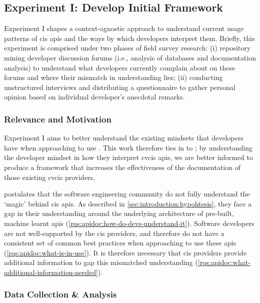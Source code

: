 \subsection{Experiment I: Develop Initial Framework}
\label{ssec:research-methodology:experiments:1}

Experiment I shapes a context-agnostic approach to understand current usage patterns of \gls{cis} \glspl{api} and the ways by which developers interpret them. Briefly, this experiment is comprised under two phases of field survey research: (i) repository mining developer discussion forums (i.e., analysis of databases and documentation analysis) to understand what developers currently complain about on these forums and where their mismatch in understanding lies; (ii) conducting unstructured interviews and distributing a questionnaire to gather personal opinion based on individual developer's anecdotal remarks.

\subsubsection{Relevance and Motivation}

Experiment I aims to better understand the existing mindsets that developers have when approaching to use . This work therefore ties in to ; by understanding the developer mindset in how they interpret \gls{cvcis} \glspl{api}, we are better informed to produce a framework that increases the effectiveness of the documentation of those existing \gls{cvcis} providers.

 postulates that the software engineering community do not fully understand the `magic' behind \gls{cis} \glspl{api}. As described in \cref{sec:introduction:hypohtesis}, they face a gap in their understanding around the underlying architecture of pre-built, machine learnt \glspl{api} (\ref{rqs:apidoc:how-do-devs-understand-it}). Software developers are not well-supported by the \gls{cis} providers, and therefore do not have a consistent set of common best practices when approaching to use these \glspl{api} (\ref{rqs:apidoc:what-is-in-use}). It is therefore necessary that \gls{cis} providers provide additional information to gap this mismatched understanding (\ref{rqs:apidoc:what-additional-information-needed}). 

\subsubsection{Data Collection \& Analysis}

